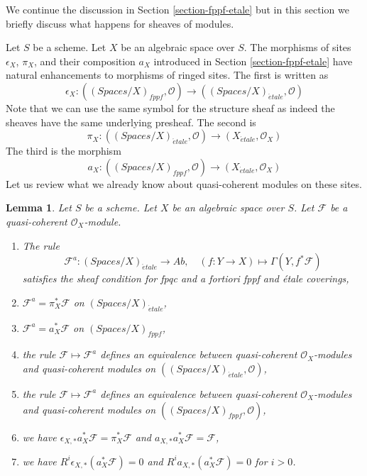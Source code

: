 \documentclass{stacks-project}
\theoremstyle{plain}
\newtheorem{lemma}[subsection]{Lemma}
\theoremstyle{definition}
\theoremstyle{remark}
\numberwithin{equation}{subsection}
\def\etale{{\acute{e}tale}}
\begin{document}
\noindent
We continue the discussion in Section \ref{section-fppf-etale} but in this
section we briefly discuss what happens for sheaves of modules.

\medskip\noindent
Let $S$ be a scheme. Let $X$ be an algebraic space over $S$.
The morphisms of sites $\epsilon_X$, $\pi_X$, and
their composition $a_X$ introduced in Section \ref{section-fppf-etale}
have natural enhancements to morphisms of ringed sites. The first
is written as
$$
\epsilon_X :
((\textit{Spaces}/X)_{fppf}, \mathcal{O})
\longrightarrow
((\textit{Spaces}/X)_\etale, \mathcal{O})
$$
Note that we can use the same symbol for the structure sheaf as indeed
the sheaves have the same underlying presheaf. The second is
$$
\pi_X :
((\textit{Spaces}/X)_\etale, \mathcal{O})
\longrightarrow
(X_\etale, \mathcal{O}_X)
$$
The third is the morphism
$$
a_X :
((\textit{Spaces}/X)_{fppf}, \mathcal{O})
\longrightarrow
(X_\etale, \mathcal{O}_X)
$$
Let us review what we already know about quasi-coherent
modules on these sites.

\begin{lemma}
\label{lemma-review-quasi-coherent}
Let $S$ be a scheme. Let $X$ be an algebraic space over $S$.
Let $\mathcal{F}$ be a quasi-coherent $\mathcal{O}_X$-module.
\begin{enumerate}
\item The rule
$$
\mathcal{F}^a : (\textit{Spaces}/X)_\etale \longrightarrow \textit{Ab},\quad
(f : Y \to X) \longmapsto \Gamma(Y, f^*\mathcal{F})
$$
satisfies the sheaf condition for fpqc and a fortiori
fppf and \'etale coverings,
\item $\mathcal{F}^a = \pi_X^*\mathcal{F}$ on $(\textit{Spaces}/X)_\etale$,
\item $\mathcal{F}^a = a_X^*\mathcal{F}$ on $(\textit{Spaces}/X)_{fppf}$,
\item the rule $\mathcal{F} \mapsto \mathcal{F}^a$ defines
an equivalence between quasi-coherent $\mathcal{O}_X$-modules
and quasi-coherent modules on
$((\textit{Spaces}/X)_\etale, \mathcal{O})$,
\item the rule $\mathcal{F} \mapsto \mathcal{F}^a$ defines
an equivalence between quasi-coherent $\mathcal{O}_X$-modules
and quasi-coherent modules on
$((\textit{Spaces}/X)_{fppf}, \mathcal{O})$,
\item we have $\epsilon_{X, *}a_X^*\mathcal{F} = \pi_X^*\mathcal{F}$
and $a_{X, *}a_X^*\mathcal{F} = \mathcal{F}$,
\item we have $R^i\epsilon_{X, *}(a_X^*\mathcal{F}) = 0$
and $R^ia_{X, *}(a_X^*\mathcal{F}) = 0$ for $i > 0$.
\end{enumerate}
\end{lemma}
\end{document}
